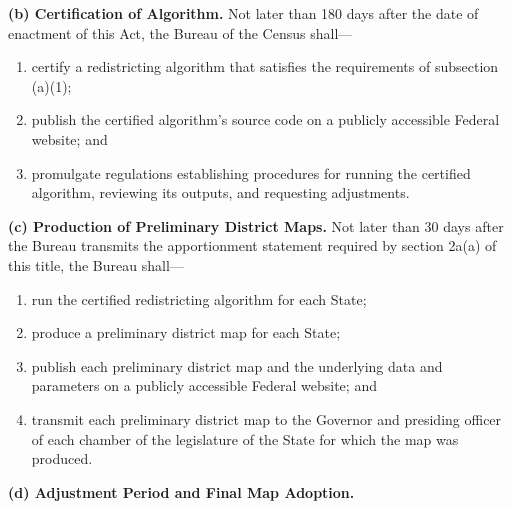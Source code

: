 \textbf{(b) Certification of Algorithm.} Not later than 180 days after the date of enactment of this Act, the Bureau of the Census shall---

\begin{enumerate}[label=(\arabic*)]
    \item certify a redistricting algorithm that satisfies the requirements of subsection (a)(1);
    \item publish the certified algorithm's source code on a publicly accessible Federal website; and
    \item promulgate regulations establishing procedures for running the certified algorithm, reviewing its outputs, and requesting adjustments.
\end{enumerate}

\textbf{(c) Production of Preliminary District Maps.} Not later than 30 days after the Bureau transmits the apportionment statement required by section 2a(a) of this title, the Bureau shall---

\begin{enumerate}[label=(\arabic*)]
    \item run the certified redistricting algorithm for each State;
    \item produce a preliminary district map for each State;
    \item publish each preliminary district map and the underlying data and parameters on a publicly accessible Federal website; and
    \item transmit each preliminary district map to the Governor and presiding officer of each chamber of the legislature of the State for which the map was produced.
\end{enumerate}

\textbf{(d) Adjustment Period and Final Map Adoption.}

